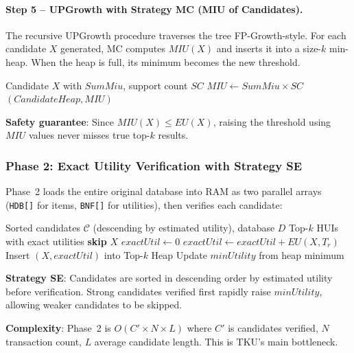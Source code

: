 \paragraph{Step 5 -- UPGrowth with Strategy MC (MIU of Candidates).}
The recursive UPGrowth procedure traverses the tree FP-Growth-style. For each candidate $X$ generated, MC computes $MIU(X)$ and inserts it into a size-$k$ min-heap. When the heap is full, its minimum becomes the new threshold.

\begin{algorithm}[H]
\caption{MC Strategy --- MIU of Candidates (Ref: \texttt{tku/tku.go}, \texttt{updateNodeCountHeap}, lines 378--393)}
\label{alg:mc}
\begin{algorithmic}[1]
\Require Candidate $X$ with $SumMiu$, support count $SC$
\State $MIU \leftarrow SumMiu \times SC$
    \State {}$(CandidateHeap, MIU)$
\EndIf
\end{algorithmic}
\end{algorithm}

\textbf{Safety guarantee}: Since $MIU(X) \leq EU(X)$, raising the threshold using $MIU$ values never misses true top-$k$ results.

\subsubsection{Phase 2: Exact Utility Verification with Strategy SE}

Phase~2 loads the entire original database into RAM as two parallel arrays (\texttt{HDB[]} for items, \texttt{BNF[]} for utilities), then verifies each candidate:

\begin{algorithm}[H]
\caption{Phase 2 --- Exact Utility Verification (Ref: \texttt{tku/phase2.go}, \texttt{readCandidateItemsets}, lines 125--193)}
\label{alg:phase2}
\begin{algorithmic}[1]
\Require Sorted candidates $\mathcal{C}$ (descending by estimated utility), database $D$
\Ensure Top-$k$ HUIs with exact utilities
        \State \textbf{skip} $X$ 
    \EndIf
    \State $exactUtil \leftarrow 0$
            \State $exactUtil \leftarrow exactUtil + EU(X, T_r)$ 
        \EndIf
    \EndFor
        \State Insert $(X, exactUtil)$ into Top-$k$ Heap
        \State Update $minUtility$ from heap minimum
    \EndIf
\EndFor
\end{algorithmic}
\end{algorithm}

\textbf{Strategy SE}: Candidates are sorted in descending order by estimated utility before verification. Strong candidates verified first rapidly raise $minUtility$, allowing weaker candidates to be skipped.

\textbf{Complexity}: Phase~2 is $O(C' \times N \times L)$ where $C'$ is candidates verified, $N$ transaction count, $L$ average candidate length. This is TKU's main bottleneck.